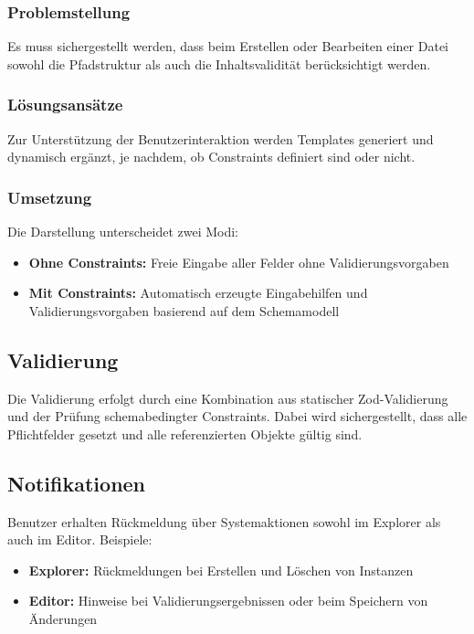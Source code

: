 \subsubsection{Problemstellung}
Es muss sichergestellt werden, dass beim Erstellen oder Bearbeiten einer Datei sowohl die Pfadstruktur als auch die Inhaltsvalidität berücksichtigt werden.

\subsubsection{Lösungsansätze}
Zur Unterstützung der Benutzerinteraktion werden Templates generiert und dynamisch ergänzt, je nachdem, ob Constraints definiert sind oder nicht.

\subsubsection{Umsetzung}
Die Darstellung unterscheidet zwei Modi:
\begin{itemize}
	\item \textbf{Ohne Constraints:} Freie Eingabe aller Felder ohne Validierungsvorgaben
	\item \textbf{Mit Constraints:} Automatisch erzeugte Eingabehilfen und Validierungsvorgaben basierend auf dem Schemamodell
\end{itemize}

\subsection{Validierung}
Die Validierung erfolgt durch eine Kombination aus statischer Zod-Validierung und der Prüfung schemabedingter Constraints. Dabei wird sichergestellt, dass alle Pflichtfelder gesetzt und alle referenzierten Objekte gültig sind.

\subsection{Notifikationen}
Benutzer erhalten Rückmeldung über Systemaktionen sowohl im Explorer als auch im Editor. Beispiele:
\begin{itemize}
	\item \textbf{Explorer:} Rückmeldungen bei Erstellen und Löschen von Instanzen
	\item \textbf{Editor:} Hinweise bei Validierungsergebnissen oder beim Speichern von Änderungen
\end{itemize}
